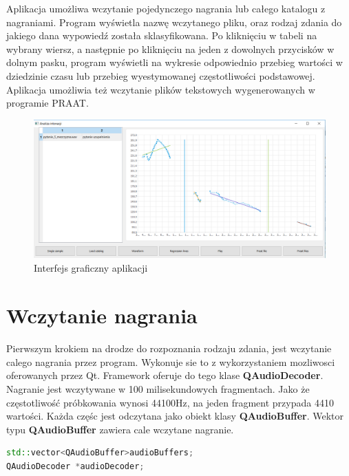 \documentclass[a4paper,12 pt]{report}
\begin{document}
Aplikacja umożliwa wczytanie pojedynczego nagrania lub całego katalogu z nagraniami. Program wyświetla nazwę wczytanego pliku, oraz rodzaj zdania do jakiego dana wypowiedź została sklasyfikowana. Po kliknięciu w tabeli na wybrany wiersz, a następnie po kliknięciu na jeden z dowolnych przycisków w dolnym pasku, program wyświetli na wykresie odpowiednio przebieg wartości w dziedzinie czasu lub przebieg wyestymowanej częstotliwości podstawowej. Aplikacja umożliwia też wczytanie plików tekstowych wygenerowanych w programie PRAAT.
\begin{figure}[h]

\includegraphics[scale=0.5]{gui.png}
\caption{Interfejs graficzny aplikacji}
\end{figure}
\FloatBarrier
\section{Wczytanie nagrania}
Pierwszym krokiem na drodze do rozpoznania rodzaju zdania, jest wczytanie calego nagrania przez program. Wykonuje sie to z wykorzystaniem mozliwosci oferowanych przez Qt. Framework oferuje do tego klase \textbf{QAudioDecoder}. 
Nagranie jest wczytywane w 100 milisekundowych fragmentach. Jako że częstotliwość próbkowania wynosi 44100Hz, na jeden fragment przypada 4410 wartości. Każda częśc jest odczytana jako obiekt klasy \textbf{QAudioBuffer}. Wektor typu \textbf{QAudioBuffer} zawiera cale wczytane nagranie.
\begin{lstlisting}[caption={Połączenie sygnałów niosących informacje o starcie lub zakończeniu wczytywania nagrania, ze slotami},label={lst:label},language=C++]
std::vector<QAudioBuffer>audioBuffers;
QAudioDecoder *audioDecoder;
\end{lstlisting}
\end{document}
